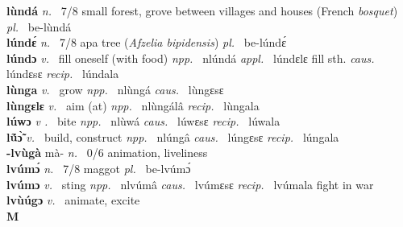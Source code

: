 {\bfseries lùndá}  {\itshape n.~} 7/8 small forest, grove between villages and houses (French {\itshape bosquet}) {\itshape pl.~} be-lùndá    \\ 
{\bfseries lúndɛ́}  {\itshape n.~} 7/8 apa tree ({\itshape Afzelia bipidensis}) {\itshape pl.~} be-lúndɛ́    \\ 
{\bfseries lúndɔ}  {\itshape v.~} fill oneself (with food)   {\itshape npp.~} nlúndá {\itshape appl.~} lúndɛlɛ fill sth. {\itshape caus.~} lúndɛsɛ {\itshape recip.~} lúndala \\ 
{\bfseries lùnga}  {\itshape v.~} grow   {\itshape npp.~} nlùngá {\itshape caus.~} lùngɛsɛ  \\ 
{\bfseries lùngɛlɛ}  {\itshape v.~} aim (at)   {\itshape npp.~} nlùngálâ {\itshape recip.~} lùngala  \\ 
{\bfseries lúwɔ}  {\itshape v     .~} bite   {\itshape npp.~} nlùwá {\itshape caus.~} lúwɛsɛ {\itshape recip.~} lúwala  \\ 
{\bfseries lṹɔ̃̀}  {\itshape v.~} build, construct   {\itshape npp.~} nlúngâ {\itshape caus.~} lúngɛsɛ {\itshape recip.~} lúngala \\ 
{\bfseries -lvùgà} mà- {\itshape n.~} 0/6 animation, liveliness    \\ 
{\bfseries lvúmɔ́}  {\itshape n.~} 7/8 maggot {\itshape pl.~} be-lvúmɔ́    \\ 
{\bfseries lvúmɔ}  {\itshape v.~} sting   {\itshape npp.~} nlvúmâ {\itshape caus.~} lvúmɛsɛ {\itshape recip.~} lvúmala fight in war  \\ 
{\bfseries lvùúgɔ}  {\itshape v.~} animate, excite   \\ 

\medskip
\noindent \large {\bfseries M}\normalsize\\
\medskip

